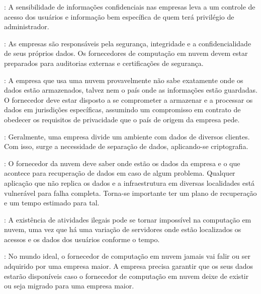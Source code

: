 \begin{itemise}

    : A sensibilidade de informações
    confidenciais nas empresas leva a um controle de acesso dos usuários e
    informação bem específica de quem terá privilégio de administrador.
    
    : As empresas são responsáveis pela
    segurança, integridade e a confidencialidade de seus próprios dados. Os
    fornecedores de computação em nuvem devem estar preparados para auditorias
    externas e certificações de segurança.
    
    : A empresa que usa uma nuvem provavelmente não
    sabe exatamente onde os dados estão armazenados, talvez nem o país onde as
    informações estão guardadas. O fornecedor deve estar disposto a se comprometer a
    armazenar e a processar os dados em jurisdições específicas, assumindo um
    compromisso em contrato de obedecer os requisitos de privacidade que o país de
    origem da empresa pede.
    
    : Geralmente, uma empresa divide um ambiente com
    dados de diversos clientes. Com isso, surge a necessidade de separação de dados,
    aplicando-se criptografia.
    
    : O fornecedor da nuvem deve saber onde estão os
    dados da empresa e o que acontece para recuperação de dados em caso de algum
    problema. Qualquer aplicação que não replica os dados e a infraestrutura em 
    diversas localidades está vulnerável para falha completa. Torna-se importante
    ter um plano de recuperação e um tempo estimado para tal.
    
    : A existência de atividades ilegais pode se tornar 
    impossível na computação em nuvem, uma vez que há uma variação de servidores 
    onde estão localizados os acessos e os dados dos usuários conforme o tempo.
    
    : No mundo ideal, o fornecedor de computação
    em nuvem jamais vai falir ou ser adquirido por uma empresa maior. A empresa
    precisa garantir que os seus dados estarão disponíveis caso o fornecedor de
    computação em nuvem deixe de existir ou seja migrado para uma empresa maior.

\end{itemise}

\undef\itemm

